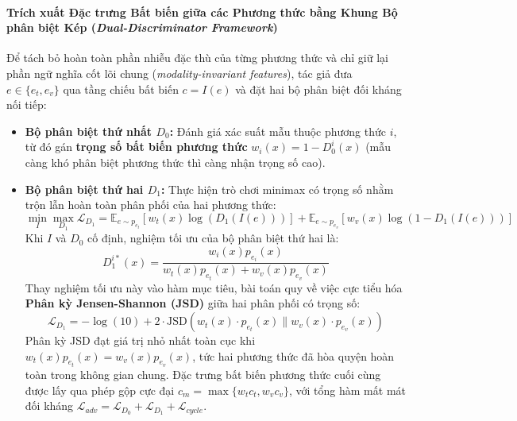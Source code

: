 \documentclass[conference,10pt]{IEEEtran}
\begin{document}
\paragraph{Trích xuất Đặc trưng Bất biến giữa các Phương thức bằng Khung Bộ phân biệt Kép (\textit{Dual-Discriminator Framework})}
Để tách bỏ hoàn toàn phần nhiễu đặc thù của từng phương thức và chỉ giữ lại phần ngữ nghĩa cốt lõi chung (\textit{modality-invariant features}), tác giả đưa $e \in \{e_t, e_v\}$ qua tầng chiếu bất biến $c = I(e)$ và đặt hai bộ phân biệt đối kháng nối tiếp:
\begin{itemize}
    \item \textbf{Bộ phân biệt thứ nhất $D_0$:} Đánh giá xác suất mẫu thuộc phương thức $i$, từ đó gán \textbf{trọng số bất biến phương thức} $w_i(x) = 1 - D_0^i(x)$ (mẫu càng khó phân biệt phương thức thì càng nhận trọng số cao).
    \item \textbf{Bộ phân biệt thứ hai $D_1$:} Thực hiện trò chơi minimax có trọng số nhằm trộn lẫn hoàn toàn phân phối của hai phương thức:
    \begin{equation}
        \min_I \max_{D_1} \mathcal{L}_{D_1} = \mathbb{E}_{e \sim p_{e_t}} \left[ w_t(x) \log\left(D_1(I(e))\right) \right] + \mathbb{E}_{e \sim p_{e_v}} \left[ w_v(x) \log\left(1 - D_1(I(e))\right) \right]
        \label{eq:cmavrp_d1}
    \end{equation}
    Khi $I$ và $D_0$ cố định, nghiệm tối ưu của bộ phân biệt thứ hai là:
    \begin{equation}
        D_1^{i*}(x) = \frac{w_i(x) p_{e_i}(x)}{w_t(x) p_{e_t}(x) + w_v(x) p_{e_v}(x)}
        \label{eq:cmavrp_d1opt}
    \end{equation}
    Thay nghiệm tối ưu này vào hàm mục tiêu, bài toán quy về việc cực tiểu hóa \textbf{Phân kỳ Jensen-Shannon (JSD)} giữa hai phân phối có trọng số:
    \begin{equation}
        \mathcal{L}_{D_1} = -\log(10) + 2 \cdot \text{JSD}\left( w_t(x) \cdot p_{e_t}(x) \parallel w_v(x) \cdot p_{e_v}(x) \right)
        \label{eq:cmavrp_jsd}
    \end{equation}
    Phân kỳ JSD đạt giá trị nhỏ nhất toàn cục khi $w_t(x) p_{e_t}(x) = w_v(x) p_{e_v}(x)$, tức hai phương thức đã hòa quyện hoàn toàn trong không gian chung. Đặc trưng bất biến phương thức cuối cùng được lấy qua phép gộp cực đại $c_m = \max\{w_t c_t, w_v c_v\}$, với tổng hàm mất mát đối kháng $\mathcal{L}_{adv} = \mathcal{L}_{D_0} + \mathcal{L}_{D_1} + \mathcal{L}_{cycle}$.
\end{itemize}
\end{document}
